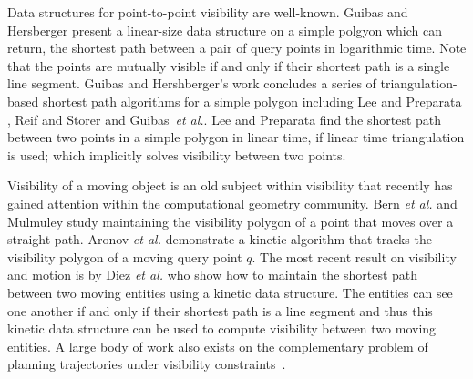 \documentclass[a4paper, UKenglish]{lipics-v2018}
\newcommand{\etal}{\textit{et al.}\xspace}
\begin{document}
Data structures for point-to-point visibility are well-known.
Guibas and Hersberger \cite{GUIBAS1989126} present a linear-size data structure on a simple polgyon which can return, the shortest path between a pair of query points in logarithmic time. Note that the points are mutually visible if and only if their shortest path is a single line segment.
Guibas and Hershberger's work concludes a series of triangulation-based shortest path algorithms for a simple polygon including Lee and Preparata \cite{LeeP84}, Reif and Storer \cite{ReifS85} and Guibas~\etal \cite{GuibasHLST87}.
Lee and Preparata \cite{LeeP84} find the shortest path between two points in a simple polygon in linear time, if linear time triangulation is used; which implicitly solves visibility between two points.


Visibility of a moving object is an old subject within visibility that recently has gained attention within the computational geometry community. Bern \etal \cite{bern1994visibility} and  Mulmuley \cite{mulmuley1991hidden} study maintaining the visibility polygon of a point that moves over a straight path. 
Aronov \etal \cite{aronov2002visibility} demonstrate a kinetic algorithm that tracks the visibility polygon of a moving query point $q$. The most recent result on visibility and motion is by Diez \etal \cite{DKRRS2017KineticAPSPEuroCG} who show how to maintain the shortest path between two moving entities using a kinetic data structure. The entities can see one another if and only if their shortest path is a line segment and thus this kinetic data structure can be used to compute visibility between two moving entities. 
A large body of work also exists on the complementary problem of planning trajectories under visibility constraints~\cite {6907405}.
\end{document}
